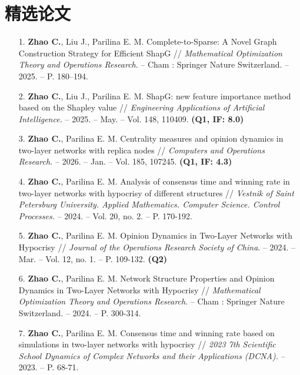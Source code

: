 \documentclass[letterpaper,10pt]{ctexart}
\begin{document}
\section{精选论文}
\begin{enumerate}
  \fontsize{10}{10.5}\selectfont
  \item [1.] \textbf{Zhao C.}, Liu J., Parilina E. M. Complete-to-Sparse: A Novel Graph Construction Strategy for Efficient ShapG // {\it Mathematical Optimization Theory and Operations Research}. -- Cham : Springer Nature Switzerland. -- 2025. -- P. 180–194.
  \item [2.] \textbf{Zhao C.}, Liu J., Parilina E. M. ShapG: new feature importance method based on the Shapley value // {\it Engineering Applications of Artificial Intelligence.} -- 2025. -- May. -- Vol. 148, 110409. {\bf (Q1, IF: 8.0)}
  \item [3.] \textbf{Zhao C.}, Parilina E. M. Centrality measures and opinion dynamics in two-layer networks with replica nodes // {\it Computers and Operations Research.} -- 2026. -- Jan. -- Vol. 185, 107245. {\bf (Q1, IF: 4.3)}
  \item [4.] \textbf{Zhao C.}, Parilina E. M. Analysis of consensus time and winning rate in two-layer networks with hypocrisy of different structures // {\it Vestnik of Saint Petersburg University. Applied Mathematics. Computer Science. Control Processes.} -- 2024. -- Vol. 20, no. 2. -- P. 170-192.
  \item [5.] \textbf{Zhao C.}, Parilina E. M. Opinion Dynamics in Two-Layer Networks with Hypocrisy // {\it Journal of the Operations Research Society of China}. -- 2024. -- Mar. -- Vol. 12, no. 1. -- P. 109-132. {\bf (Q2)}
  \item [6.] \textbf{Zhao C.}, Parilina E. M. Network Structure Properties and Opinion Dynamics in Two-Layer Networks with Hypocrisy // {\it Mathematical Optimization Theory and Operations Research}. -- Cham : Springer Nature Switzerland. -- 2024. -- P. 300-314.
  \item [7.] \textbf{Zhao C.}, Parilina E. M. Consensus time and winning rate based on simulations in two-layer networks with hypocrisy // {\it 2023 7th Scientific School Dynamics of Complex Networks and their Applications (DCNA).} -- 2023. -- P. 68-71.
\end{enumerate}
\end{document}
